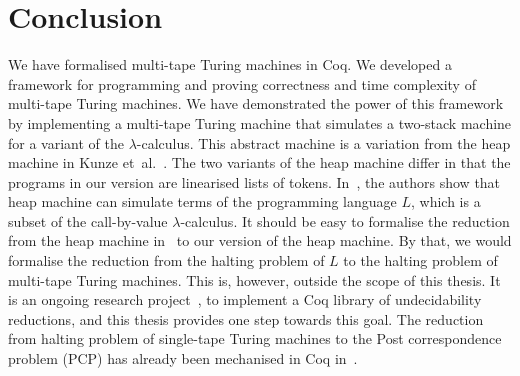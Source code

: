 \chapter{Conclusion}
\label{chap:conclusion}

We have formalised multi-tape Turing machines in Coq.  We developed a framework for programming and proving correctness and time complexity of
multi-tape Turing machines.  We have demonstrated the power of this framework by implementing a multi-tape Turing machine that simulates a two-stack
machine for a variant of the $\lambda$-calculus.  This abstract machine is a variation from the heap machine in Kunze
et~al.~\cite{KunzeEtAl:2018:Formal}.  The two variants of the heap machine differ in that the programs in our version are linearised lists of tokens.
In~\cite{KunzeEtAl:2018:Formal}, the authors show that heap machine can simulate terms of the programming language $L$, which is a subset of the
call-by-value $\lambda$-calculus.  It should be easy to formalise the reduction from the heap machine in~\cite{KunzeEtAl:2018:Formal} to our version
of the heap machine.  By that, we would formalise the reduction from the halting problem of $L$ to the halting problem of multi-tape Turing machines.
This is, however, outside the scope of this thesis.  It is an ongoing research project~\cite{ForsterLOLA2018}, to implement a Coq library of
undecidability reductions, and this thesis provides one step towards this goal.  The reduction from halting problem of single-tape Turing machines to
the Post correspondence problem (PCP) has already been mechanised in Coq in~\cite{PCPITP}.

